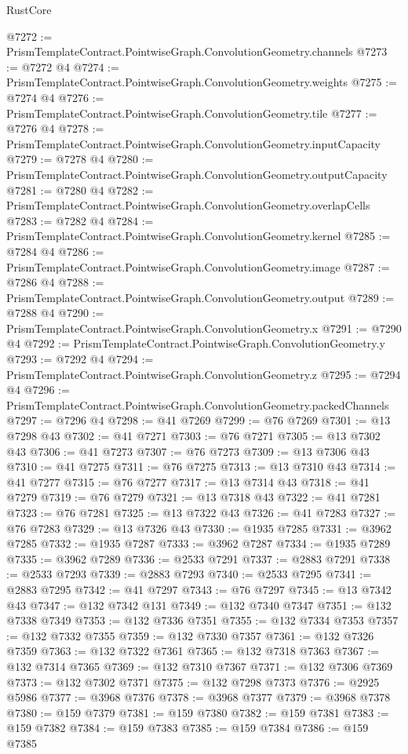 \begin{lexlean}{RustCore}
\begin{coremodule}
@7272 := PrismTemplateContract.PointwiseGraph.ConvolutionGeometry.channels
@7273 := @7272 @4
@7274 := PrismTemplateContract.PointwiseGraph.ConvolutionGeometry.weights
@7275 := @7274 @4
@7276 := PrismTemplateContract.PointwiseGraph.ConvolutionGeometry.tile
@7277 := @7276 @4
@7278 := PrismTemplateContract.PointwiseGraph.ConvolutionGeometry.inputCapacity
@7279 := @7278 @4
@7280 := PrismTemplateContract.PointwiseGraph.ConvolutionGeometry.outputCapacity
@7281 := @7280 @4
@7282 := PrismTemplateContract.PointwiseGraph.ConvolutionGeometry.overlapCells
@7283 := @7282 @4
@7284 := PrismTemplateContract.PointwiseGraph.ConvolutionGeometry.kernel
@7285 := @7284 @4
@7286 := PrismTemplateContract.PointwiseGraph.ConvolutionGeometry.image
@7287 := @7286 @4
@7288 := PrismTemplateContract.PointwiseGraph.ConvolutionGeometry.output
@7289 := @7288 @4
@7290 := PrismTemplateContract.PointwiseGraph.ConvolutionGeometry.x
@7291 := @7290 @4
@7292 := PrismTemplateContract.PointwiseGraph.ConvolutionGeometry.y
@7293 := @7292 @4
@7294 := PrismTemplateContract.PointwiseGraph.ConvolutionGeometry.z
@7295 := @7294 @4
@7296 := PrismTemplateContract.PointwiseGraph.ConvolutionGeometry.packedChannels
@7297 := @7296 @4
@7298 := @41 @7269
@7299 := @76 @7269
@7301 := @13 @7298 @43
@7302 := @41 @7271
@7303 := @76 @7271
@7305 := @13 @7302 @43
@7306 := @41 @7273
@7307 := @76 @7273
@7309 := @13 @7306 @43
@7310 := @41 @7275
@7311 := @76 @7275
@7313 := @13 @7310 @43
@7314 := @41 @7277
@7315 := @76 @7277
@7317 := @13 @7314 @43
@7318 := @41 @7279
@7319 := @76 @7279
@7321 := @13 @7318 @43
@7322 := @41 @7281
@7323 := @76 @7281
@7325 := @13 @7322 @43
@7326 := @41 @7283
@7327 := @76 @7283
@7329 := @13 @7326 @43
@7330 := @1935 @7285
@7331 := @3962 @7285
@7332 := @1935 @7287
@7333 := @3962 @7287
@7334 := @1935 @7289
@7335 := @3962 @7289
@7336 := @2533 @7291
@7337 := @2883 @7291
@7338 := @2533 @7293
@7339 := @2883 @7293
@7340 := @2533 @7295
@7341 := @2883 @7295
@7342 := @41 @7297
@7343 := @76 @7297
@7345 := @13 @7342 @43
@7347 := @132 @7342 @131
@7349 := @132 @7340 @7347
@7351 := @132 @7338 @7349
@7353 := @132 @7336 @7351
@7355 := @132 @7334 @7353
@7357 := @132 @7332 @7355
@7359 := @132 @7330 @7357
@7361 := @132 @7326 @7359
@7363 := @132 @7322 @7361
@7365 := @132 @7318 @7363
@7367 := @132 @7314 @7365
@7369 := @132 @7310 @7367
@7371 := @132 @7306 @7369
@7373 := @132 @7302 @7371
@7375 := @132 @7298 @7373
@7376 := @2925 @5986
@7377 := @3968 @7376
@7378 := @3968 @7377
@7379 := @3968 @7378
@7380 := @159 @7379
@7381 := @159 @7380
@7382 := @159 @7381
@7383 := @159 @7382
@7384 := @159 @7383
@7385 := @159 @7384
@7386 := @159 @7385

\end{coremodule}
\end{lexlean}
